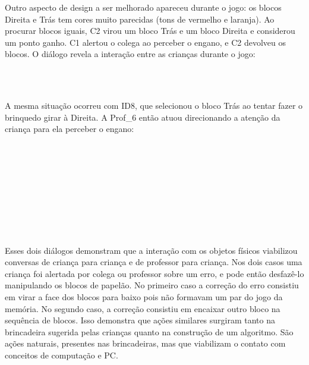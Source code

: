 Outro aspecto de design a ser melhorado apareceu durante o jogo: os blocos Direita e Trás tem cores muito parecidas (tons de vermelho e laranja). Ao procurar blocos iguais, C2 virou um bloco Trás e um bloco Direita e considerou um ponto ganho. C1 alertou o colega ao perceber o engano, e C2 devolveu os blocos. O diálogo revela a interação entre as crianças durante o jogo:

\begin{dialogo}
     \\
     \\ 
\end{dialogo}

A mesma situação ocorreu com ID8, que selecionou o bloco Trás ao tentar fazer o brinquedo girar à Direita. A Prof\_6 então atuou direcionando a atenção da criança para ela perceber o engano:

\begin{dialogo}
     \\
     \\
     \\
      \\
     \\
      \\
     \\
      \\
\end{dialogo}

Esses dois diálogos demonstram que a interação com os objetos físicos viabilizou conversas de criança para criança e de professor para criança. Nos dois casos uma criança foi alertada por colega ou professor sobre um erro, e pode então desfazê-lo manipulando os blocos de papelão. No primeiro caso a correção do erro consistiu em virar a face dos blocos para baixo pois não formavam um par do jogo da memória. No segundo caso, a correção consistiu em encaixar outro bloco na sequência de blocos. Isso demonstra que ações similares surgiram tanto na brincadeira sugerida pelas crianças quanto na construção de um algoritmo. São ações naturais, presentes nas brincadeiras, mas que viabilizam o contato com conceitos de computação e \ac{PC}.

